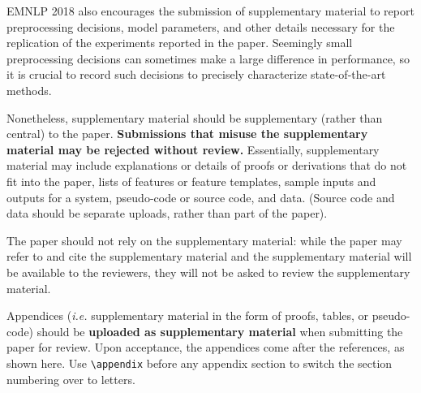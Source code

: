 \documentclass[11pt,a4paper]{article}
\newcommand\confname{EMNLP 2018}
\begin{document}
\confname{} also encourages the submission of supplementary material
to report preprocessing decisions, model parameters, and other details
necessary for the replication of the experiments reported in the
paper. Seemingly small preprocessing decisions can sometimes make a
large difference in performance, so it is crucial to record such
decisions to precisely characterize state-of-the-art methods.

Nonetheless, supplementary material should be supplementary (rather
than central) to the paper. {\bf Submissions that misuse the supplementary 
material may be rejected without review.}
Essentially, supplementary material may include explanations or details
of proofs or derivations that do not fit into the paper, lists of
features or feature templates, sample inputs and outputs for a system,
pseudo-code or source code, and data. (Source code and data should
be separate uploads, rather than part of the paper).

The paper should not rely on the supplementary material: while the paper
may refer to and cite the supplementary material and the supplementary material will be available to the
reviewers, they will not be asked to review the
supplementary material.

Appendices ({\em i.e.} supplementary material in the form of proofs, tables,
or pseudo-code) should be {\bf uploaded as supplementary material} when submitting the paper for review.
Upon acceptance, the appendices come after the references, as shown here. Use
\verb|\appendix| before any appendix section to switch the section
numbering over to letters.
\end{document}
